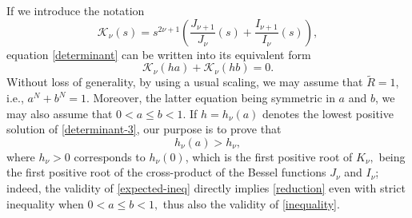 \documentclass[11pt, reqno]{amsart}
\numberwithin{equation}{section}
\begin{document}
		If we introduce the notation 
		\begin{equation}\label{determinant-2}
			\mathcal K_\nu(s)=s^{2\nu+1}\left(\frac{J_{\nu+1}}{J_\nu}(s)+\frac{I_{\nu+1}}{I_\nu}(s)\right),
		\end{equation}
		equation \eqref{determinant} can be written into its equivalent form 
		\begin{equation}\label{determinant-3}
			\mathcal K_\nu(ha)+\mathcal K_\nu(hb)=0.
		\end{equation}
		Without loss of generality, by using a usual scaling, we may assume that $\tilde R=1$, i.e., $a^N+b^N=1.$ Moreover, the latter equation being  symmetric in $a$ and $b$, we may also assume that $0<a\leq b<1.$ If $h=h_\nu(a)$
		denotes the lowest positive solution of \eqref{determinant-3}, 
		our purpose is to prove that 
		\begin{equation}\label{expected-ineq}
			h_\nu(a)> h_\nu,
		\end{equation}
		where $h_\nu>0$ corresponds to $h_\nu(0)$, which  is the first positive root of $K_\nu,$ being  the first positive root of the cross-product of the Bessel functions $J_\nu$ and $I_\nu$; indeed, the validity of  \eqref{expected-ineq} directly implies \eqref{reduction} even with strict inequality when $0<a\leq b<1,$ thus also the validity of \eqref{inequality}. 
		
\end{document}
